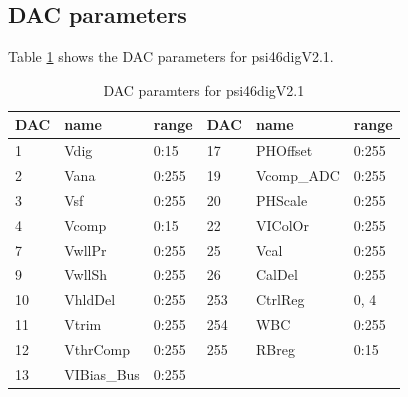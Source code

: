 \documentclass[english]{article}
\providecommand{\tabularnewline}{\\}
\begin{document}
\subsection{DAC parameters}

Table \ref{tab:DACparam} shows the DAC parameters for psi46digV2.1.

%
\begin{table}
\noindent \begin{centering}
\begin{tabular}{|l|l|l|l|l|l|}
\hline 
DAC  & name  & range  & DAC  & name  & range\tabularnewline
\hline
\hline 
1  & Vdig  & 0:15  & 17  & PHOffset  & 0:255\tabularnewline
\hline 
2  & Vana  & 0:255  & 19  & Vcomp\_ADC  & 0:255\tabularnewline
\hline 
3  & Vsf  & 0:255  & 20  & PHScale  & 0:255\tabularnewline
\hline 
4  & Vcomp  & 0:15  & 22  & VIColOr  & 0:255\tabularnewline
\hline 
7  & VwllPr  & 0:255  & 25  & Vcal  & 0:255\tabularnewline
\hline 
9  & VwllSh  & 0:255  & 26  & CalDel  & 0:255\tabularnewline
\hline 
10  & VhldDel  & 0:255  & 253  & CtrlReg  & 0, 4\tabularnewline
\hline 
11  & Vtrim  & 0:255  & 254  & WBC  & 0:255\tabularnewline
\hline 
12  & VthrComp  & 0:255  & 255  & RBreg  & 0:15\tabularnewline
\hline 
13  & VIBias\_Bus  & 0:255  &  &  & \tabularnewline
\hline
\end{tabular}
\par\end{centering}

\protect\caption{DAC paramters for psi46digV2.1\label{tab:DACparam}}
%
\end{table}
\end{document}
